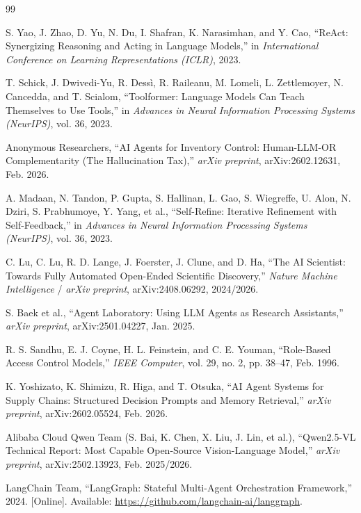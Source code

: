\documentclass[11pt,a4paper]{article}
\begin{document}
\begin{thebibliography}{99}
\small
\setlength{\itemsep}{0.2pt}
\setlength{\parskip}{0pt}

 S. Yao, J. Zhao, D. Yu, N. Du, I. Shafran, K. Narasimhan, and Y. Cao, ``ReAct: Synergizing Reasoning and Acting in Language Models,'' in \textit{International Conference on Learning Representations (ICLR)}, 2023.

 T. Schick, J. Dwivedi-Yu, R. Dessì, R. Raileanu, M. Lomeli, L. Zettlemoyer, N. Cancedda, and T. Scialom, ``Toolformer: Language Models Can Teach Themselves to Use Tools,'' in \textit{Advances in Neural Information Processing Systems (NeurIPS)}, vol. 36, 2023.

 Anonymous Researchers, ``AI Agents for Inventory Control: Human-LLM-OR Complementarity (The Hallucination Tax),'' \textit{arXiv preprint}, arXiv:2602.12631, Feb. 2026.

 A. Madaan, N. Tandon, P. Gupta, S. Hallinan, L. Gao, S. Wiegreffe, U. Alon, N. Dziri, S. Prabhumoye, Y. Yang, et al., ``Self-Refine: Iterative Refinement with Self-Feedback,'' in \textit{Advances in Neural Information Processing Systems (NeurIPS)}, vol. 36, 2023.

 C. Lu, C. Lu, R. D. Lange, J. Foerster, J. Clune, and D. Ha, ``The AI Scientist: Towards Fully Automated Open-Ended Scientific Discovery,'' \textit{Nature Machine Intelligence} / \textit{arXiv preprint}, arXiv:2408.06292, 2024/2026.

 S. Baek et al., ``Agent Laboratory: Using LLM Agents as Research Assistants,'' \textit{arXiv preprint}, arXiv:2501.04227, Jan. 2025.

 R. S. Sandhu, E. J. Coyne, H. L. Feinstein, and C. E. Youman, ``Role-Based Access Control Models,'' \textit{IEEE Computer}, vol. 29, no. 2, pp. 38--47, Feb. 1996.

 K. Yoshizato, K. Shimizu, R. Higa, and T. Otsuka, ``AI Agent Systems for Supply Chains: Structured Decision Prompts and Memory Retrieval,'' \textit{arXiv preprint}, arXiv:2602.05524, Feb. 2026.

 Alibaba Cloud Qwen Team (S. Bai, K. Chen, X. Liu, J. Lin, et al.), ``Qwen2.5-VL Technical Report: Most Capable Open-Source Vision-Language Model,'' \textit{arXiv preprint}, arXiv:2502.13923, Feb. 2025/2026.

 LangChain Team, ``LangGraph: Stateful Multi-Agent Orchestration Framework,'' 2024. [Online]. Available: \url{https://github.com/langchain-ai/langgraph}.

\end{thebibliography}
\end{document}
